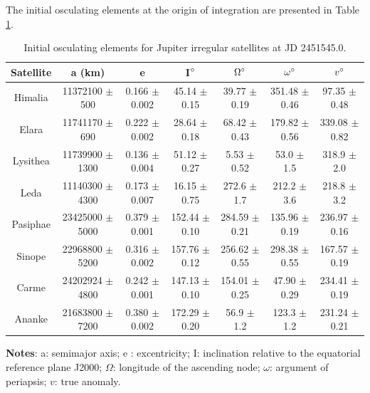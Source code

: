 \documentclass[useAMS,usenatbib]{mn2e}
\begin{document}
The initial osculating elements at the origin of integration are presented in Table \ref{Tab: sat_ell}.

\begin{table}
\caption{Initial osculating elements for Jupiter irregular satellites at JD 2451545.0.
 }\label{Tab: sat_ell}
\begin{center}
\begin{tabular}{ccccccc}
\hline\hline
Satellite & a (km) & e & I$\hbox{$^\circ$}$ & $\Omega\hbox{$^\circ$}$ & $\omega\hbox{$^\circ$}$ & $v\hbox{$^\circ$}$ \\ 
\hline
Himalia &   11372100 $\pm$ 500    &    0.166 $\pm$ 0.002      &   45.14 $\pm$ 0.15      &   39.77 $\pm$ 0.19      &   351.48 $\pm$ 0.46      &   97.35 $\pm$ 0.48    \\
Elara &   11741170 $\pm$ 690  &      0.222 $\pm$ 0.002      &   28.64 $\pm$ 0.18      &   68.42 $\pm$ 0.43      &   179.82 $\pm$ 0.56      &   339.08 $\pm$ 0.82  \\
Lysithea &   11739900 $\pm$ 1300  &      0.136 $\pm$ 0.004      &    51.12 $\pm$ 0.27     &   5.53 $\pm$ 0.52      &   53.0 $\pm$ 1.5      &   318.9 $\pm$ 2.0   \\
Leda &   11140300  $\pm$ 4300  &     0.173  $\pm$ 0.007     &   16.15  $\pm$ 0.75    &   272.6  $\pm$ 1.7    &   212.2  $\pm$ 3.6          &   218.8  $\pm$ 3.2  \\
Pasiphae &  23425000  $\pm$ 5000    &     0.379  $\pm$ 0.001       &   152.44 $\pm$ 0.10      &   284.59 $\pm$ 0.21      &   135.96 $\pm$ 0.19      &   236.97 $\pm$ 0.16 \\
Sinope &   22968800 $\pm$ 5200   &     0.316 $\pm$ 0.002      &   157.76 $\pm$ 0.12      &   256.62 $\pm$ 0.55      &   298.38 $\pm$ 0.55      &   167.57 $\pm$ 0.19    \\
Carme &   24202924 $\pm$ 4800      &  0.242 $\pm$ 0.001      &   147.13 $\pm$ 0.10      &   154.01 $\pm$ 0.25      &   47.90 $\pm$ 0.29      &   234.41 $\pm$ 0.19  \\
Ananke &  21683800  $\pm$ 7200  &     0.380 $\pm$ 0.002      &   172.29 $\pm$ 0.20      &   56.9 $\pm$ 1.2      &   123.3 $\pm$ 1.2      &   231.24 $\pm$ 0.21  \\
\hline
\end{tabular} 
\end{center}
\begin{flushleft}
\textbf{Notes}: a: semimajor axis; e : excentricity; I: inclination relative to the equatorial reference plane J2000; $\Omega$: longitude of the ascending node; $\omega$: argument of periapsis; $v$: true anomaly.
\end{flushleft}
\end{table}
\end{document}

